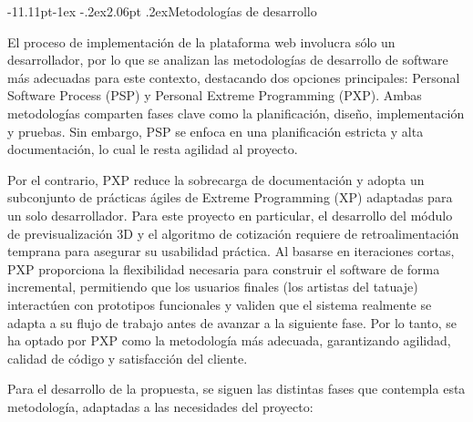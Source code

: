 \documentclass[12pt,letterpaper,oneside]{report}
\makeatletter
\renewcommand\subsection{\@startsection{subsection}{2}{\z@}%
  {-11.11pt\@plus -1ex \@minus -.2ex}{2.06pt \@plus .2ex}{\normalfont\normalsize\bfseries}}
\makeatother
\begin{document}
\subsection{Metodologías de desarrollo}

El proceso de implementación de la plataforma web involucra sólo un desarrollador, por lo que se analizan las metodologías de desarrollo de software más adecuadas para este contexto, destacando dos opciones principales: Personal Software Process (PSP)\cite{humphrey2000} y Personal Extreme Programming (PXP)\cite{dzhurov2009}. Ambas metodologías comparten fases clave como la planificación, diseño, implementación y pruebas. Sin embargo, PSP se enfoca en una planificación estricta y alta documentación, lo cual le resta agilidad al proyecto.

Por el contrario, PXP reduce la sobrecarga de documentación y adopta un subconjunto de prácticas ágiles de Extreme Programming (XP)\cite{joskowicz2008} adaptadas para un solo desarrollador. Para este proyecto en particular, el desarrollo del módulo de previsualización 3D y el algoritmo de cotización requiere de retroalimentación temprana para asegurar su usabilidad práctica. Al basarse en iteraciones cortas, PXP proporciona la flexibilidad necesaria para construir el software de forma incremental, permitiendo que los usuarios finales (los artistas del tatuaje) interactúen con prototipos funcionales y validen que el sistema realmente se adapta a su flujo de trabajo antes de avanzar a la siguiente fase. Por lo tanto, se ha optado por PXP como la metodología más adecuada, garantizando agilidad, calidad de código y satisfacción del cliente.

Para el desarrollo de la propuesta, se siguen las distintas fases que contempla esta metodología, adaptadas a las necesidades del proyecto:
\end{document}
